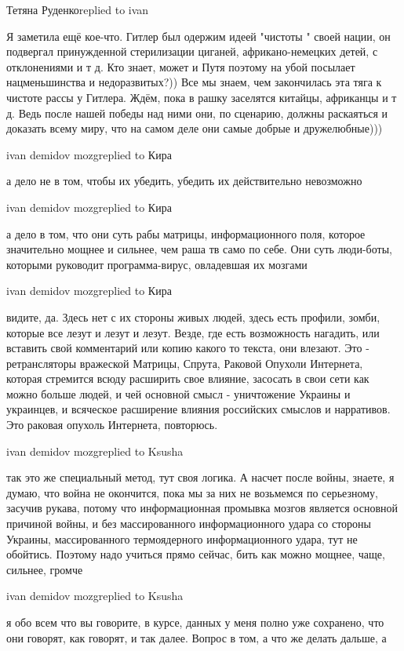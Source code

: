  
 
 
 
 

Тетяна Руденкоreplied to ivan

Я заметила ещё кое-что. Гитлер был одержим идеей "чистоты " своей нации, он
подвергал принужденной стерилизации циганей, африкано-немецких детей, с
отклонениями и т д. Кто знает, может и Путя поэтому на убой посылает
нацменьшинства и недоразвитых?)) Все мы знаем, чем закончилась эта тяга к
чистоте рассы у Гитлера. Ждём, пока в рашку заселятся китайцы, африканцы и т д.
Ведь после нашей победы над ними они, по сценарию, должны раскаяться и доказать
всему миру, что на самом деле они самые добрые и дружелюбные)))

ivan demidov mozgreplied to Кира

а дело не в том, чтобы их убедить, убедить их действительно невозможно

ivan demidov mozgreplied to Кира

а дело в том, что они суть рабы матрицы, информационного поля, которое
значительно мощнее и сильнее, чем раша тв само по себе. Они суть люди-боты,
которыми руководит программа-вирус, овладевшая их мозгами

ivan demidov mozgreplied to Кира

видите, да. Здесь нет с их стороны живых людей, здесь есть профили, зомби,
которые все лезут и лезут и лезут. Везде, где есть возможность нагадить, или
вставить свой комментарий или копию какого то текста, они влезают. Это -
ретрансляторы вражеской Матрицы, Спрута, Раковой Опухоли Интернета, которая
стремится всюду расширить свое влияние, засосать в свои сети как можно больше
людей, и чей основной смысл - уничтожение Украины и украинцев, и всяческое
расширение влияния российских смыслов и нарративов. Это раковая опухоль
Интернета, повторюсь.

ivan demidov mozgreplied to Ksusha

так это же специальный метод, тут своя логика. А насчет после войны, знаете, я
думаю, что война не окончится, пока мы за них не возьмемся по серьезному,
засучив рукава, потому что информационная промывка мозгов является основной
причиной войны, и без массированного информационного удара со стороны Украины,
массированного термоядерного информационного удара, тут не обойтись. Поэтому
надо учиться прямо сейчас, бить как можно мощнее, чаще, сильнее, громче

ivan demidov mozgreplied to Ksusha

я обо всем что вы говорите, в курсе, данных у меня полно уже сохранено, что они
говорят, как говорят, и так далее. Вопрос в том, а что же делать дальше, а
